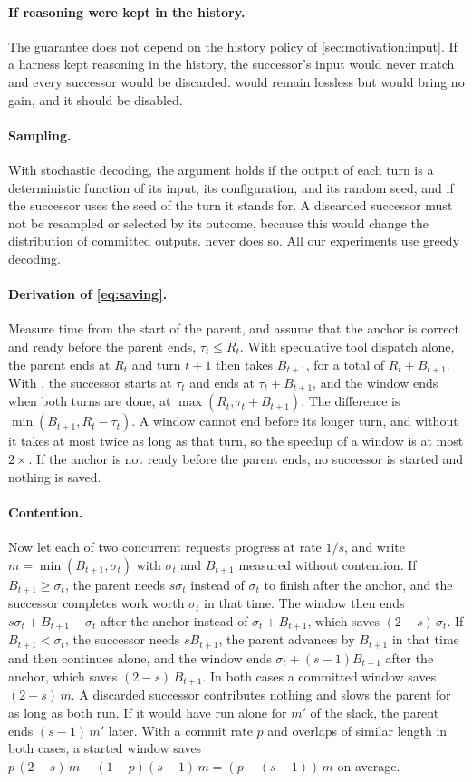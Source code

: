 \paragraph{If reasoning were kept in the history.}
The guarantee does not depend on the history policy of \cref{sec:motivation:input}.
If a harness kept reasoning in the history, the successor's input would never match and every successor would be discarded.
\method would remain lossless but would bring no gain, and it should be disabled.

\paragraph{Sampling.}
With stochastic decoding, the argument holds if the output of each turn is a deterministic function of its input, its configuration, and its random seed, and if the successor uses the seed of the turn it stands for.
A discarded successor must not be resampled or selected by its outcome, because this would change the distribution of committed outputs.
\method never does so.
All our experiments use greedy decoding.

\paragraph{Derivation of \cref{eq:saving}.}
Measure time from the start of the parent, and assume that the anchor is correct and ready before the parent ends, $\tau_t\le R_t$.
With speculative tool dispatch alone, the parent ends at $R_t$ and turn $t{+}1$ then takes $B_{t+1}$, for a total of $R_t+B_{t+1}$.
With \method, the successor starts at $\tau_t$ and ends at $\tau_t+B_{t+1}$, and the window ends when both turns are done, at $\max(R_t,\tau_t+B_{t+1})$.
The difference is $\min(B_{t+1},R_t-\tau_t)$.
A window cannot end before its longer turn, and without \method it takes at most twice as long as that turn, so the speedup of a window is at most $2\times$.
If the anchor is not ready before the parent ends, no successor is started and nothing is saved.

\paragraph{Contention.}
Now let each of two concurrent requests progress at rate $1/s$, and write $m=\min(B_{t+1},\sigma_t)$ with $\sigma_t$ and $B_{t+1}$ measured without contention.
If $B_{t+1}\ge\sigma_t$, the parent needs $s\sigma_t$ instead of $\sigma_t$ to finish after the anchor, and the successor completes work worth $\sigma_t$ in that time.
The window then ends $s\sigma_t+B_{t+1}-\sigma_t$ after the anchor instead of $\sigma_t+B_{t+1}$, which saves $(2-s)\,\sigma_t$.
If $B_{t+1}<\sigma_t$, the successor needs $sB_{t+1}$, the parent advances by $B_{t+1}$ in that time and then continues alone, and the window ends $\sigma_t+(s-1)B_{t+1}$ after the anchor, which saves $(2-s)\,B_{t+1}$.
In both cases a committed window saves $(2-s)\,m$.
A discarded successor contributes nothing and slows the parent for as long as both run.
If it would have run alone for $m'$ of the slack, the parent ends $(s-1)\,m'$ later.
With a commit rate $p$ and overlaps of similar length in both cases, a started window saves $p\,(2-s)\,m-(1-p)(s-1)\,m=(p-(s-1))\,m$ on average.
